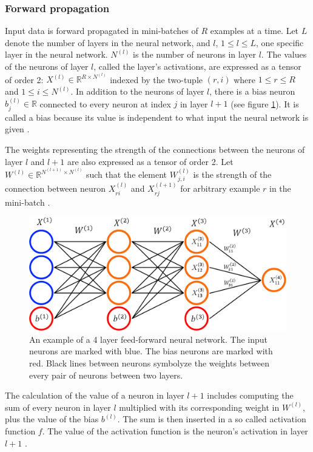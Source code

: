\documentclass[a4paper, twoside]{article}
\begin{document}
\subsubsection{Forward propagation}
Input data is forward propagated in mini-batches of $R$ examples at a time. Let $L$ denote the number of layers in the neural network, and $l$, $1 \leq l \leq L$, one specific layer in the neural network. $N^{(l)}$ is the number of neurons in layer $l$. The values of the neurons of layer $l$, called the layer's activations, are expressed as a tensor of order 2: $X^{(l)} \in \mathbb{R}^{R \times N^{(l)}}$ indexed by the two-tuple $(r,i)$ where $1 \leq r \leq R$ and $1 \leq i \leq N^{(l)}$. In addition to the neurons of layer $l$, there is a bias neuron $b^{(l)}_j \in \mathbb{R}$ connected to every neuron at index $j$ in layer $l+1$ (see figure \ref{figFCCmath}). It is called a bias because its value is independent to what input the neural network is given \cite{cs231n} \cite{wikiStanford}.

The weights representing the strength of the connections between the neurons of layer $l$ and $l+1$ are also expressed as a tensor of order 2. Let $W^{(l)} \in \mathbb{R}^{N^{(l+1)}  \times N^{(l)}}$ such that the element $W_{j, i}^{(l)}$ is the strength of the connection between neuron $X_{ri}^{(l)}$ and $X_{rj}^{(l+1)}$ for arbitrary example $r$ in the mini-batch \cite{cs231n} \cite{wikiStanford}.

\begin{figure}[h]
	\centering
  		\includegraphics[scale=0.4]{FCC.png}
  	\caption{An example of a 4 layer feed-forward neural network. The input neurons are marked with blue. The bias neurons are marked with red. Black lines between neurons symbolyze the weights between every pair of neurons between two layers.} \label{figFCCmath}
\end{figure}

The calculation of the value of a neuron in layer $l+1$ includes computing the sum of every neuron in layer $l$ multiplied with its corresponding weight in $W^{(l)}$, plus the value of the bias $b^{(l)}$. The sum is then inserted in a so called activation function $f$. The value of the activation function is the neuron's activation in layer $l+1$ \cite{cs231n} \cite{wikiStanford}.
\end{document}
